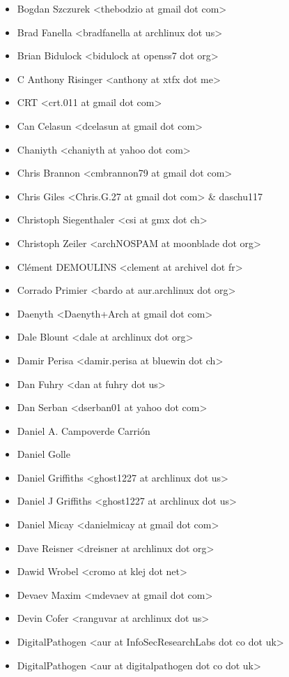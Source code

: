 \begin{itemize}
\item  Bogdan Szczurek <thebodzio at gmail dot com>
\item  Brad Fanella <bradfanella at archlinux dot us>
\item  Brian Bidulock <bidulock at openss7 dot org>
\item  C Anthony Risinger <anthony at xtfx dot me>
\item  CRT <crt.011 at gmail dot com>
\item  Can Celasun <dcelasun at gmail dot com>
\item  Chaniyth <chaniyth at yahoo dot com>
\item  Chris Brannon <cmbrannon79 at gmail dot com>
\item  Chris Giles <Chris.G.27 at gmail dot com> \& daschu117
\item  Christoph Siegenthaler <csi at gmx dot ch>
\item  Christoph Zeiler <archNOSPAM at moonblade dot org>
\item  Clément DEMOULINS <clement at archivel dot fr>
\item  Corrado Primier <bardo at aur.archlinux dot org>
\item  Daenyth <Daenyth+Arch at gmail dot com>
\item  Dale Blount <dale at archlinux dot org>
\item  Damir Perisa <damir.perisa at bluewin dot ch>
\item  Dan Fuhry <dan at fuhry dot us>
\item  Dan Serban <dserban01 at yahoo dot com>
\item  Daniel A. Campoverde Carrión
\item  Daniel Golle
\item  Daniel Griffiths <ghost1227 at archlinux dot us>
\item  Daniel J Griffiths <ghost1227 at archlinux dot us>
\item  Daniel Micay <danielmicay at gmail dot com>
\item  Dave Reisner <dreisner at archlinux dot org>
\item  Dawid Wrobel <cromo at klej dot net>
\item  Devaev Maxim <mdevaev at gmail dot com>
\item  Devin Cofer <ranguvar at archlinux dot us>
\item  DigitalPathogen <aur at InfoSecResearchLabs dot co dot uk>
\item  DigitalPathogen <aur at digitalpathogen dot co dot uk>

\end{itemize}
